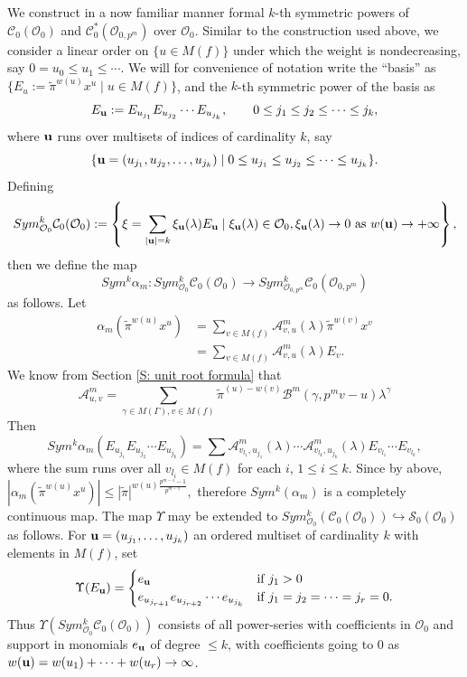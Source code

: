 \documentclass{article}
\theoremstyle{remark}
\def\c #1{ {\mathcal #1} }
\def\b #1{ {\bf #1} }
\begin{document}
\bigskip{} We construct in a now familiar manner formal $k$-th symmetric powers of $\c C_0(\c O_0)$ and $\c C_0^*(\c O_{0, p^m})$ over $\c O_0$. Similar to the construction used above, we consider a linear order on $\{ u \in M(f) \}$ under which the weight is nondecreasing, say $0 = u_0 \leq u_1 \leq \cdots$. We will for convenience of notation write the ``basis'' as $\{ E_u := \tilde \pi^{w(u)} x^u \mid u \in M(f) \}$, and the $k$-th symmetric power of the basis as
\[
E_{\b u} := E_{u_{j_1}} E_{u_{j_2}} \cdots E_{u_{j_k}}, \qquad 0 \leq j_1 \leq j_2 \leq \cdots \leq j_k,
\] 
where $\b u$ runs over multisets of indices of cardinality $k$, say
\[
\{ \b u = (u_{j_1}, u_{j_2}, \ldots, u_{j_k}) \mid 0 \leq u_{j_1} \leq u_{j_2} \leq \cdots \leq u_{j_k} \}.
\]
Defining
\[
Sym^k_{\c O_0} \c C_0(\c O_0) := \left\{ \xi = \sum_{|\b u| = k} \xi_{\b u}(\lambda) E_{\b u} \mid \xi_{\b u}(\lambda) \in \c O_0, \xi_{\b u}(\lambda) \rightarrow 0 \text{ as } w(\b u) \rightarrow +\infty  \right\},
\]
then we define the map
\[
Sym^k \alpha_m: Sym^k_{\c O_0} \c C_0(\c O_0) \rightarrow Sym^k_{\c O_{0, p^m}} \c C_0(\c O_{0, p^m})
\]
as follows. Let
\begin{align*}
\alpha_m(\tilde \pi^{w(u)} x^u) &= \sum_{v \in M(f)} \mathcal{A}^m_{v, u}(\lambda) \tilde \pi^{w(v)} x^v \\
&= \sum_{v \in M(f)} \mathcal{A}^m_{v, u}(\lambda) E_v.
\end{align*}
We know from Section \ref{S: unit root formula} that 
\[
\mathcal{A}^m_{u,v} = \sum_{\gamma \in M(\Gamma), v \in M(f)} \tilde{\pi}^{(u)-w(v)} \mathcal{B}^m(\gamma, p^mv-u)\lambda^{\gamma}
\]
Then
\[
Sym^k \alpha_m(E_{u_{j_1}} E_{u_{j_2}} \cdots E_{u_{j_k}}) = \sum \mathcal{A}^m_{v_{l_1}, u_{j_1}}(\lambda) \cdots \mathcal{A}^m_{v_{l_k}, u_{j_k}}(\lambda) E_{v_{l_1}} \cdots E_{v_{l_k}},
\]
where the sum runs over all $v_{l_i} \in M(f)$ for each $i$, $1 \leq i \leq k$. Since by above, $|\alpha_m(\tilde \pi^{w(u)} x^u)| \leq |\tilde \pi|^{w(u) \frac{p^{m -1}-1}{p^{m-1}}}, $ therefore $Sym^k(\alpha_m)$ is a completely continuous map. The map $\Upsilon$ may be extended to $Sym^k_{\c O_0}(\c C_0(\c O_0)) \hookrightarrow \c S_0(\c O_0)$ as follows. For $\b u = (u_{j_1}, \ldots, u_{j_k})$ an ordered multiset of cardinality $k$ with elements in $M(f)$, set 
\[
\Upsilon(E_{\b u}) = 
\begin{cases}
e_{\b u} & \text{if } j_1 > 0 \\
e_{u_{j_{r+1}}} e_{u_{j_{r+2}}} \cdots e_{u_{j_k}} & \text{if } j_1 = j_2 = \cdots = j_r = 0.
\end{cases}
\]
Thus $\Upsilon(Sym^k_{\c O_0} \c C_0(\c O_0))$ consists of all power-series with coefficients in $\c O_0$ and support in monomials $e_{\b u}$ of degree $\leq k$, with coefficients going to $0$ as $w(\b u) = w(u_1) + \cdots + w(u_r) \rightarrow \infty$.
\end{document}
